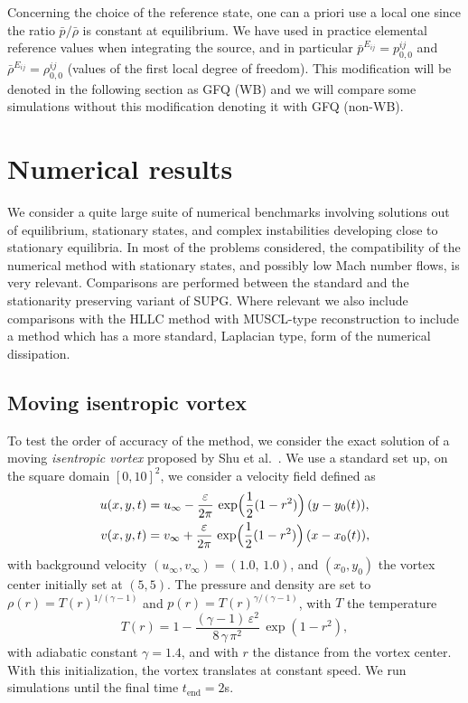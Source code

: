 \documentclass[a4paper,10pt]{article}
\begin{document}
Concerning the choice of the   reference state,  one can a priori use a local one since the ratio $\bar p/\bar \rho$ is constant at equilibrium. We
have used in practice elemental reference values when integrating the source, and in particular $\bar p^{E_{ij}} = p^{ij}_{0,0}$ and $\bar \rho^{E_{ij}} = \rho^{ij}_{0,0}$ (values of the first local degree of freedom).
This modification will be denoted in the following section as GFQ (WB) and we will compare some simulations without this modification denoting it with GFQ (non-WB).



\section{Numerical results}\label{sec:results}
We consider a quite large suite of numerical benchmarks involving solutions out of equilibrium, stationary states, and complex 
instabilities developing close to stationary equilibria. In most of the problems considered, the compatibility of the numerical method with stationary states,
and possibly low Mach number flows, is very relevant. Comparisons are performed between the standard and the stationarity preserving variant of SUPG.
Where relevant   we also include comparisons with the HLLC \cite{Toro1994,Batten1997} method with MUSCL-type reconstruction \cite{vanLeer1979} to include a method which
has a  more standard, Laplacian type, form of the numerical  dissipation. 

\subsection{Moving isentropic vortex}


To test the order of accuracy of the method, we consider the exact solution of a moving \textit{isentropic vortex} proposed by Shu et al.~\cite{ShuVortex1998}.
We use a standard set up, on the square  domain  $[0,10]^2$, we consider a velocity field defined as 
\begin{equation}\label{eq:vel_vortex}
	\begin{split}
		u(x,y,t) &= u_\infty - \frac{\varepsilon}{2\pi}\,\exp\Bigl(\frac{1}{2}(1 - r^2)\Bigr)\,(y - y_0(t)), \\
		v(x,y,t) &= v_\infty + \frac{\varepsilon}{2\pi}\,\exp\Bigl(\frac{1}{2}(1 - r^2)\Bigr)\,(x - x_0(t)),
	\end{split}
\end{equation}
with background velocity $(u_\infty, v_\infty) = (1.0,\,1.0)$, and $(x_0,y_0)$ the vortex center initially set  at $(5,5)$.
The pressure and density are set to  $\rho(r) = T(r)^{1/(\gamma - 1)}$ and  $p(r) = T(r)^{\gamma / (\gamma - 1)}$, with $T$  the temperature 
\begin{equation}\label{eq:temp_vortex}
	T(r) = 1 - \frac{(\gamma - 1)\,\varepsilon^2}{8\,\gamma\,\pi^2}\,\exp(1 - r^2),
\end{equation}
with    adiabatic constant  $\gamma=1.4$, and  with $r$ the distance from the vortex center.
With this initialization, the vortex  translates at constant speed. We run simulations until  the final time $t_{\mathrm{end}}=2$s.
\end{document}
